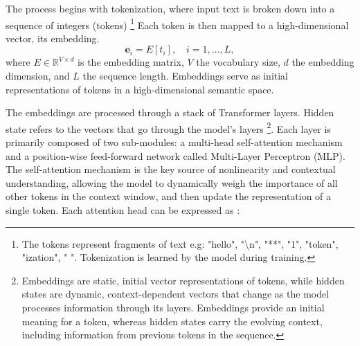 \documentclass[a4paper,12pt]{article}
\begin{document}
The process begins with tokenization, where input text is broken down into a sequence of integers (tokens) \footnote{The tokens represent fragments of text e.g: "hello", "\textbackslash n", "**", "1", "token", "ization", " ". Tokenization is learned by the model during training.} Each token is then mapped to a high-dimensional vector, its embedding.
\begin{equation}
    \mathbf{e}_i = E[t_i], \quad i = 1, \dots, L,
\end{equation}
where $E \in \mathbb{R}^{V \times d}$ is the embedding matrix, $V$ the vocabulary size, $d$ the embedding dimension, and $L$ the sequence length. Embeddings serve as initial representations of tokens in a high-dimensional semantic space. 

The embeddings are processed through a stack of Transformer layers. Hidden state refers to the vectors that go through the model's layers \footnote{Embeddings are static, initial vector representations of tokens, while hidden states are dynamic, context-dependent vectors that change as the model processes information through its layers. Embeddings provide an initial meaning for a token, whereas hidden states carry the evolving context, including information from previous tokens in the sequence.}. Each layer is primarily composed of two sub-modules: a multi-head self-attention mechanism and a position-wise feed-forward network called Multi-Layer Perceptron (MLP). The self-attention mechanism is the key source of nonlinearity and contextual understanding, allowing the model to dynamically weigh the importance of all other tokens in the context window, and then update the representation of a single token. Each attention head can be expressed as \cite{attention}:
\end{document}
